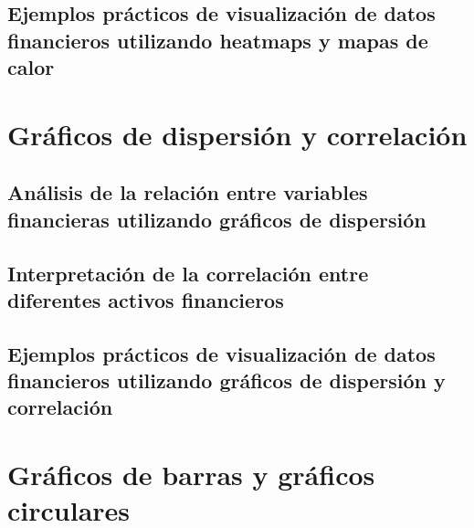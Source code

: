 \documentclass[
  a4paper,
]{article}
\begin{document}
\hypertarget{ejemplos-pruxe1cticos-de-visualizaciuxf3n-de-datos-financieros-utilizando-heatmaps-y-mapas-de-calor}{%
\subsection{Ejemplos prácticos de visualización de datos financieros
utilizando heatmaps y mapas de
calor}\label{ejemplos-pruxe1cticos-de-visualizaciuxf3n-de-datos-financieros-utilizando-heatmaps-y-mapas-de-calor}}

\hypertarget{gruxe1ficos-de-dispersiuxf3n-y-correlaciuxf3n}{%
\section{Gráficos de dispersión y
correlación}\label{gruxe1ficos-de-dispersiuxf3n-y-correlaciuxf3n}}

\hypertarget{anuxe1lisis-de-la-relaciuxf3n-entre-variables-financieras-utilizando-gruxe1ficos-de-dispersiuxf3n}{%
\subsection{Análisis de la relación entre variables financieras
utilizando gráficos de
dispersión}\label{anuxe1lisis-de-la-relaciuxf3n-entre-variables-financieras-utilizando-gruxe1ficos-de-dispersiuxf3n}}

\hypertarget{interpretaciuxf3n-de-la-correlaciuxf3n-entre-diferentes-activos-financieros}{%
\subsection{Interpretación de la correlación entre diferentes activos
financieros}\label{interpretaciuxf3n-de-la-correlaciuxf3n-entre-diferentes-activos-financieros}}

\hypertarget{ejemplos-pruxe1cticos-de-visualizaciuxf3n-de-datos-financieros-utilizando-gruxe1ficos-de-dispersiuxf3n-y-correlaciuxf3n}{%
\subsection{Ejemplos prácticos de visualización de datos financieros
utilizando gráficos de dispersión y
correlación}\label{ejemplos-pruxe1cticos-de-visualizaciuxf3n-de-datos-financieros-utilizando-gruxe1ficos-de-dispersiuxf3n-y-correlaciuxf3n}}

\hypertarget{gruxe1ficos-de-barras-y-gruxe1ficos-circulares}{%
\section{Gráficos de barras y gráficos
circulares}\label{gruxe1ficos-de-barras-y-gruxe1ficos-circulares}}
\end{document}
